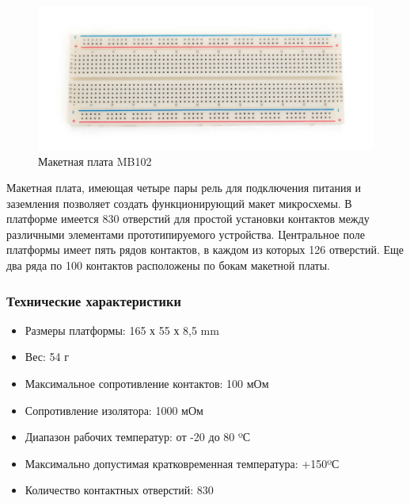 \documentclass[a4paper,11pt]{article}
\begin{document}
\begin{center}
  \begin{figure}[h]
    \includegraphics[scale=0.7]{images/pic_8.jpg}
    \caption{Макетная плата MB102}
  \end{figure}
\end{center}
\noindent Макетная плата, имеющая четыре пары рель для подключения питания и заземления позволяет создать функционирующий макет микросхемы. В платформе имеется 830 отверстий для простой установки контактов между различными элементами прототипируемого устройства. Центральное поле платформы имеет пять рядов контактов, в каждом из которых 126 отверстий. Еще два ряда по 100 контактов расположены по бокам макетной платы.
\subsubsection{Технические характеристики}
\begin{itemize}
  \item Размеры платформы: 165 х 55 х 8,5 mm
  \item Вес: 54 г
  \item Максимальное сопротивление контактов: 100 мОм
  \item Сопротивление изолятора: 1000 мОм
  \item Диапазон рабочих температур: от -20 до 80 ºС
  \item Максимально допустимая кратковременная температура: +150ºС
  \item Количество контактных отверстий: 830
\end{itemize}
\end{document}

